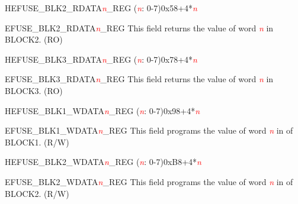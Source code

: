 \begin{register}{H}{EFUSE\_BLK2\_RDATA\textcolor{red}{\it{n}}\_REG (\textcolor{red}{\it{n}}: 0-7)}{0x58+4*\textcolor{red}{\it{n}}}\label{regdesc:EFUSEBLK2RDATAnREG}
%
\regnewline%
\begin{regdesc}\begin{reglist}
\item [EFUSE\_BLK2\_RDATA\textcolor{red}{\it{n}}\_REG]This field returns the value of word \textcolor{red}{\textit{n}} in BLOCK2. (RO)
\end{reglist}\end{regdesc}
\end{register}


\begin{register}{H}{EFUSE\_BLK3\_RDATA\textcolor{red}{\it{n}}\_REG (\textcolor{red}{\it{n}}: 0-7)}{0x78+4*\textcolor{red}{\it{n}}}\label{regdesc:EFUSEBLK3RDATAnREG}
%
\regnewline%
\begin{regdesc}\begin{reglist}
\item [EFUSE\_BLK3\_RDATA\textcolor{red}{\it{n}}\_REG]This field returns the value of word \textcolor{red}{\textit{n}} in BLOCK3. (RO)
\end{reglist}\end{regdesc}
\end{register}


\begin{register}{H}{EFUSE\_BLK1\_WDATA\textcolor{red}{\it{n}}\_REG (\textcolor{red}{\it{n}}: 0-7)}{0x98+4*\textcolor{red}{\it{n}}}\label{regdesc:EFUSEBLK1WDATAnREG}
%
\regnewline%
\begin{regdesc}\begin{reglist}
\item [EFUSE\_BLK1\_WDATA\textcolor{red}{\it{n}}\_REG]This field programs the value of word \textcolor{red}{\textit{n}} in of BLOCK1. (R/W)
\end{reglist}\end{regdesc}
\end{register}


\begin{register}{H}{EFUSE\_BLK2\_WDATA\textcolor{red}{\it{n}}\_REG (\textcolor{red}{\it{n}}: 0-7)}{0xB8+4*\textcolor{red}{\it{n}}}\label{regdesc:EFUSEBLK2WDATAnREG}
%
\regnewline%
\begin{regdesc}\begin{reglist}
\item [EFUSE\_BLK2\_WDATA\textcolor{red}{\it{n}}\_REG]This field programs the value of word \textcolor{red}{\textit{n}} in of BLOCK2. (R/W)
\end{reglist}\end{regdesc}
\end{register}


